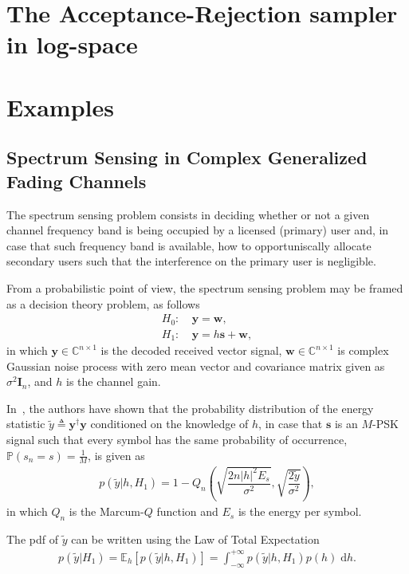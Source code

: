 \documentclass[conference, 10pt]{IEEEtran}
\begin{document}
\section{The Acceptance-Rejection sampler in log-space}

\section{Examples}
\subsection{Spectrum Sensing in Complex Generalized Fading Channels}

The spectrum sensing problem consists in deciding whether or not a given channel
frequency band is being occupied by a licensed (primary) user and, in case that such
frequency band is available, how to opportuniscally allocate secondary users
such that the interference on the primary user is negligible.

From a probabilistic point of view, the spectrum sensing problem may be framed as
a decision theory problem, as follows
\begin{align}
    H_0:~& \bm{y} = \bm{w},\\
    H_1:~& \bm{y} = h\bm{s} + \bm{w},
\end{align}
in which $\bm{y} \in \mathbb{C}^{n\times 1}$ is the decoded received vector signal,
$\bm{w} \in \mathbb{C}^{n\times 1}$ is complex Gaussian noise process with zero mean
vector and covariance matrix given as $\sigma^2\bm{I}_n$, and $h$ is the channel gain.

In~\cite{cardoso2017}, the authors have shown that the probability distribution of the
energy statistic $\tilde{y} \triangleq \bm{y}^{\dagger}\bm{y}$ conditioned on the knowledge of $h$,
in case that $\bm{s}$ is an $M$-PSK signal such that every symbol has the same probability of occurrence,
$\mathbb{P}(s_n = s) = \frac{1}{M}$, is given as
\begin{align}
    p(\tilde{y} | h, H_1) = 1 - Q_{n}\left(\sqrt{\dfrac{2n|h|^2E_s}{\sigma^2}}, \sqrt{\dfrac{2\tilde{y}}{\sigma^2}}\right),
\end{align}
in which $Q_{n}$ is the Marcum-$Q$ function and $E_s$ is the energy per symbol.

The pdf of $\tilde{y}$ can be written using the Law of Total Expectation
\begin{align}
    p(\tilde{y} | H_1) = \mathbb{E}_{h}\left[p(\tilde{y} | h, H_{1})\right]
                 = \int_{-\infty}^{+\infty} p(\tilde{y} | h, H_1)p(h)\;\mathrm{d}h.
\end{align}
\end{document}
